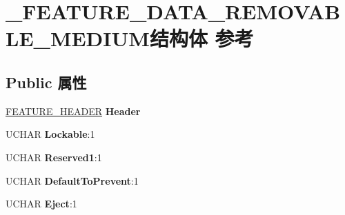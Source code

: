 \hypertarget{struct___f_e_a_t_u_r_e___d_a_t_a___r_e_m_o_v_a_b_l_e___m_e_d_i_u_m}{}\section{\+\_\+\+F\+E\+A\+T\+U\+R\+E\+\_\+\+D\+A\+T\+A\+\_\+\+R\+E\+M\+O\+V\+A\+B\+L\+E\+\_\+\+M\+E\+D\+I\+U\+M结构体 参考}
\label{struct___f_e_a_t_u_r_e___d_a_t_a___r_e_m_o_v_a_b_l_e___m_e_d_i_u_m}
\subsection*{Public 属性}
\begin{DoxyCompactItemize}
\item 
\mbox{\label{struct___f_e_a_t_u_r_e___d_a_t_a___r_e_m_o_v_a_b_l_e___m_e_d_i_u_m_ab200478eebd60c922525193b83cba411}} 
\hyperlink{struct___f_e_a_t_u_r_e___h_e_a_d_e_r}{F\+E\+A\+T\+U\+R\+E\+\_\+\+H\+E\+A\+D\+ER} {\bfseries Header}
\item 
\mbox{\label{struct___f_e_a_t_u_r_e___d_a_t_a___r_e_m_o_v_a_b_l_e___m_e_d_i_u_m_a63b97f8394e79ed2936a4997b07b53a2}} 
U\+C\+H\+AR {\bfseries Lockable}\+:1
\item 
\mbox{\label{struct___f_e_a_t_u_r_e___d_a_t_a___r_e_m_o_v_a_b_l_e___m_e_d_i_u_m_aadd1d3676e8de7d4d0853a6e23f8c8c8}} 
U\+C\+H\+AR {\bfseries Reserved1}\+:1
\item 
\mbox{\label{struct___f_e_a_t_u_r_e___d_a_t_a___r_e_m_o_v_a_b_l_e___m_e_d_i_u_m_adf83a0599d28ac2510e7b790bde63680}} 
U\+C\+H\+AR {\bfseries Default\+To\+Prevent}\+:1
\item 
\mbox{\label{struct___f_e_a_t_u_r_e___d_a_t_a___r_e_m_o_v_a_b_l_e___m_e_d_i_u_m_a077f95c6fd384aed902e8e77b82989e8}} 
U\+C\+H\+AR {\bfseries Eject}\+:1
\item 

\end{DoxyCompactItemize}
